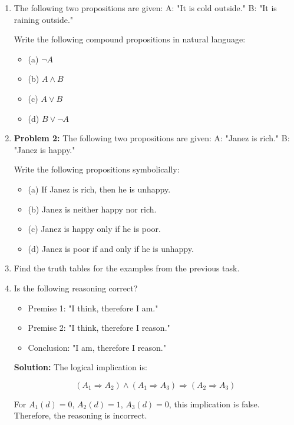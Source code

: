 \documentclass[11pt,paper=b5,footinclude,headinclude]{scrbook} %
\theoremstyle{remark}
\theoremstyle{definition} %
\theoremstyle{theorem} %
\begin{document}
\begin{enumerate}
    \item 
The following two propositions are given:
A: "It is cold outside."
B: "It is raining outside."

Write the following compound propositions in natural language:
\begin{itemize}
    \item (a) $\neg A$
    \item (b) $A \land B$
    \item (c) $A \lor B$
    \item (d) $B \lor \neg A$
\end{itemize}

\item \textbf{Problem 2:}
The following two propositions are given:
A: "Janez is rich."
B: "Janez is happy."

Write the following propositions symbolically:
\begin{itemize}
    \item (a) If Janez is rich, then he is unhappy.
    \item (b) Janez is neither happy nor rich.
    \item (c) Janez is happy only if he is poor.
    \item (d) Janez is poor if and only if he is unhappy.
\end{itemize}

\item 
Find the truth tables for the examples from the previous task.


\item
Is the following reasoning correct?

\begin{itemize}
    \item Premise 1: "I think, therefore I am."
    \item Premise 2: "I think, therefore I reason."
    \item Conclusion: "I am, therefore I reason."
\end{itemize}

\textbf{Solution:} The logical implication is:

\[
(A_1 \Rightarrow A_2) \land (A_1 \Rightarrow A_3) \Rightarrow (A_2 \Rightarrow A_3)
\]

For \( A_1(d) = 0 \), \( A_2(d) = 1 \), \( A_3(d) = 0 \), this implication is false. Therefore, the reasoning is incorrect.
\end{enumerate}
\end{document}
